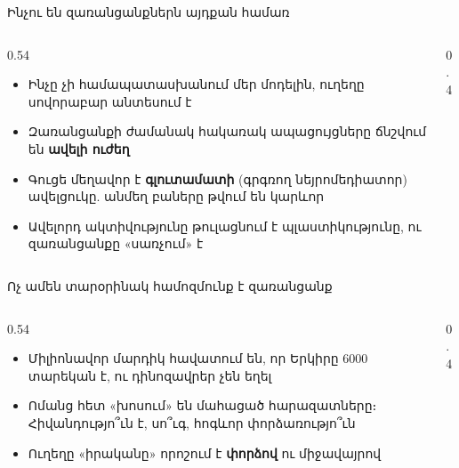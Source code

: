 \begin{frame}{Ինչու են զառանցանքներն այդքան համառ}
  \begin{columns}[c]
    \begin{column}{0.54\textwidth}
      \begin{itemize}
        \item Ինչը չի համապատասխանում մեր մոդելին, ուղեղը սովորաբար անտեսում է
        \item<2-> Զառանցանքի ժամանակ հակառակ ապացույցները ճնշվում են \textbf{ավելի ուժեղ}
        \item<3-> Գուցե մեղավոր է \textbf{գլուտամատի} (գրգռող նեյրոմեդիատոր) ավելցուկը. անմեղ բաները թվում են կարևոր
        \item<4-> Ավելորդ ակտիվությունը թուլացնում է պլաստիկությունը, ու զառանցանքը «սառչում» է
      \end{itemize}
    \end{column}
    \begin{column}{0.4\textwidth}
    \end{column}
  \end{columns}
\end{frame}

\begin{frame}{Ոչ ամեն տարօրինակ համոզմունք է զառանցանք}
  \begin{columns}[c]
    \begin{column}{0.54\textwidth}
      \begin{itemize}
        \item Միլիոնավոր մարդիկ հավատում են, որ Երկիրը 6000 տարեկան է, ու դինոզավրեր չեն եղել
        \item Ոմանց հետ «խոսում» են մահացած հարազատները։ Հիվանդությո՞ւն է, սո՞ւգ, հոգևոր փորձառությո՞ւն
        \item<2-> Ուղեղը «իրականը» որոշում է \textbf{փորձով} ու միջավայրով
      \end{itemize}
    \end{column}
    \begin{column}{0.4\textwidth}
    \end{column}
  \end{columns}
\end{frame}

